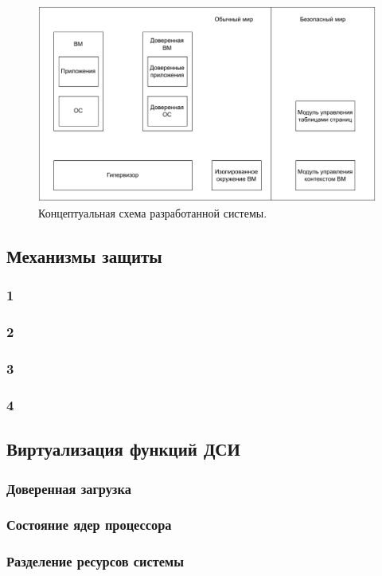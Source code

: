 \begin{figure}[h]
	\centering
	\includegraphics[width=\textwidth]{img/full-design.pdf}
	\caption{Концептуальная схема разработанной системы.}
	\label{fig:full-design}
\end{figure}

\subsection{Механизмы защиты}

\subsubsection{1}

\subsubsection{2}

\subsubsection{3}

\subsubsection{4}

\subsection{Виртуализация функций ДСИ}

\subsubsection{Доверенная загрузка}

\subsubsection{Состояние ядер процессора}

\subsubsection{Разделение ресурсов системы}

\pagebreak
